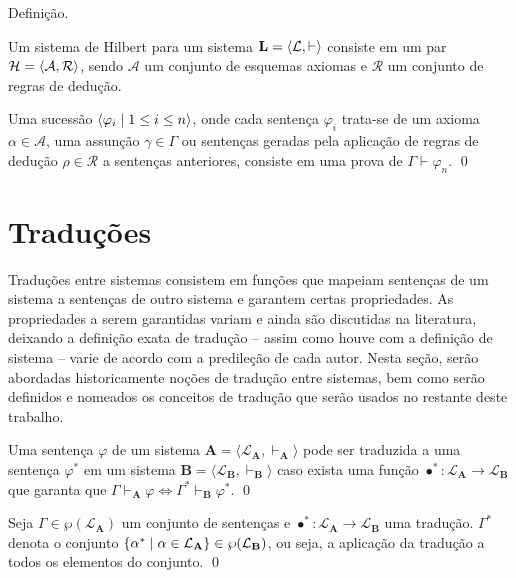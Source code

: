\begin{definition}[Esquema]
    Definição.
\end{definition}

\begin{definition}[Axiomatização]
    Um sistema de Hilbert para um sistema $\mathbf{L} = \langle\mathcal{L}, \vdash\rangle$ consiste em um par $\mathcal{H} = \langle\mathcal{A}, \mathcal{R}\rangle$, sendo $\mathcal{A}$ um conjunto de esquemas axiomas e $\mathcal{R}$ um conjunto de regras de dedução. 
\end{definition}

\begin{definition}[Dedução]
    Uma sucessão $\langle\varphi_i\mid 1 \leq i\leq n\rangle$, onde cada sentença $\varphi_i$ trata-se de um axioma $\alpha \in \mathcal{A}$, uma assunção $\gamma \in \Gamma$ ou sentenças geradas pela aplicação de regras de dedução $\rho \in \mathcal{R}$ a sentenças anteriores, consiste em uma prova de $\Gamma \vdash \varphi_n$.
    \qed
\end{definition}

\section{Traduções}

Traduções entre sistemas consistem em funções que mapeiam sentenças de um sistema a sentenças de outro sistema e garantem certas propriedades. As propriedades a serem garantidas variam e ainda são discutidas na literatura, deixando a definição exata de tradução -- assim como houve com a definição de sistema -- varie de acordo com a predileção de cada autor. Nesta seção, serão abordadas historicamente noções de tradução entre sistemas, bem como serão definidos e nomeados os conceitos de tradução que serão usados no restante deste trabalho.

\begin{definition}[Tradução] 
    Uma sentença $\varphi$ de um sistema $\mathbf{A} = \langle \mathcal{L}_\mathbf{A}, \vdash_\mathbf{A}\rangle$ pode ser traduzida a uma sentença $\varphi^*$ em um sistema $\mathbf{B} = \langle \mathcal{L}_\mathbf{B}, \vdash_\mathbf{B} \rangle$ caso exista uma função $\bullet^* : \mathcal{L}_\mathbf{A} \to \mathcal{L}_\mathbf{B}$ que garanta que $\Gamma \vdash_\mathbf{A} \varphi \Leftrightarrow \Gamma^* \vdash_\mathbf{B} \varphi^*$.
    \qed
\end{definition}

\begin{notation}
    Seja $\Gamma\in\wp(\mathcal{L}_\mathbf{A})$ um conjunto de sentenças e $\bullet^*\mathrel{:}\mathcal{L}_\mathbf{A}\to\mathcal{L}_\mathbf{B}$ uma tradução. $\Gamma^*$ denota o conjunto $\{\alpha^*\mid\alpha\in\mathcal{L}_\mathbf{A}\}\in\wp(\mathcal{L}_\mathbf{B})$, ou seja, a aplicação da tradução a todos os elementos do conjunto.
    \qed
\end{notation}

